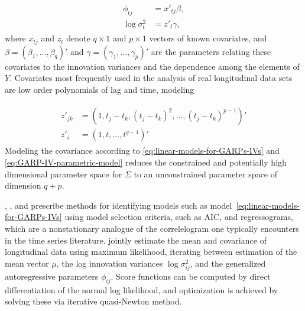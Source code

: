 \begin{align}
\begin{split} \label{eq:linear-models-for-GARPs-IVs}
\phi_{tj} &= x'_{tj} \beta,\\
\log\sigma_t^2 &= z'_t \gamma,
\end{split}
\end{align}
\noindent
where $x_{tj}$ and $z_{t}$ denote $q \times 1$ and $p \times 1$ vectors of known covariates, and $\beta = \left(\beta_1,\dots, \beta_q \right)'$ and $\gamma = \left(\gamma_1,\dots, \gamma_p \right)'$ are the parameters relating these covariates to the innovation variances and the dependence among the elements of $Y$. Covariates most frequently used in the analysis of real longitudinal data sets are low order polynomials of lag and time, modeling

\begin{align}
\begin{split}  \label{eq:GARP-IV-parametric-model}
z'_{jk} &= \left(1, t_j - t_k, \left(t_j - t_k\right)^2,\dots, \left(t_j - t_k\right)^{p-1}\right)' \\
z'_{i}  &= \left(1, t, \dots, t^{q-1}\right)'
\end{split}
\end{align}
\noindent
Modeling the covariance according to \ref{eq:linear-models-for-GARPs-IVs} and \ref{eq:GARP-IV-parametric-model} reduces the constrained and potentially high dimensional parameter space for $\Sigma$ to an unconstrained parameter space of dimension $q + p$.

\bigskip

\citet{pourahmadi1999joint}, \citet{pourahmadi2000maximum}, and \citet{pan2006regression} prescribe methods for identifying models such as model~\ref{eq:linear-models-for-GARPs-IVs} using model selection criteria, such as AIC, and regressograms, which are a nonstationary analogue of the correlelogram one typically encounters in the time series literature. \citet{pan2003modelling} jointly estimate the mean and covariance of longitudinal data using maximum likelihood, iterating between estimation of the mean vector $\mu$, the log innovation variances $\log \sigma_{ij}^2$, and the generalized autoregressive parameters $\phi_{ij}$. Score functions can be computed  by direct differentiation of the normal log likelihood, and optimization is achieved by solving these via iterative quasi-Newton method. 


\bigskip


